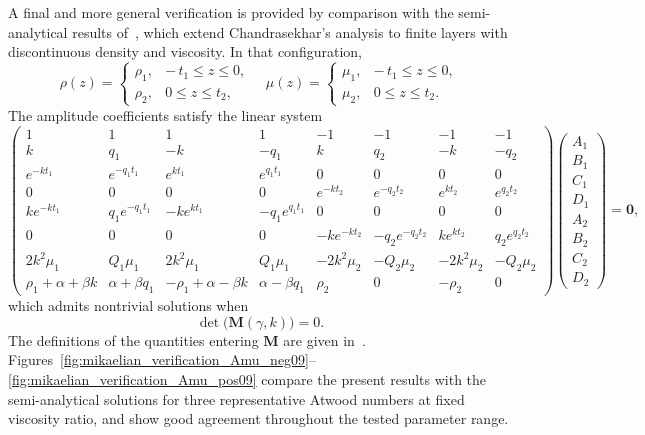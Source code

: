 \documentclass[11pt]{article}
\newenvironment{appen}{\appendix}{}
\begin{document}
\begin{appen}
A final and more general verification is provided by comparison with the semi-analytical results of~\citet{mikaelian-1996}, which extend Chandrasekhar's analysis to finite layers with discontinuous density and viscosity. In that configuration,
\begin{equation}
    \rho(z) =
    \begin{cases}
        \rho_{1}, & -\,t_{1} \le z \le 0, \\
        \rho_{2}, & 0 \le z \le t_{2},
    \end{cases}
    \quad
    \mu(z) =
    \begin{cases}
        \mu_{1}, & -\,t_{1} \le z \le 0, \\
        \mu_{2}, & 0 \le z \le t_{2}.
    \end{cases}
\end{equation}
The amplitude coefficients satisfy the linear system
\begin{equation}
    \begin{pmatrix}
        1 & 1 & 1 & 1 & -1 & -1 & -1 & -1 \\
        k & q_{1} & -k & -q_{1} & k & q_{2} & -k & -q_{2} \\
        e^{-k t_{1}} & e^{-q_{1} t_{1}} & e^{k t_{1}} & e^{q_{1} t_{1}} & 0 & 0 & 0 & 0 \\
        0 & 0 & 0 & 0 & e^{-k t_{2}} & e^{-q_{2} t_{2}} & e^{k t_{2}} & e^{q_{2} t_{2}} \\
        k e^{-k t_{1}} & q_{1} e^{-q_{1} t_{1}} & -k e^{k t_{1}} & -q_{1} e^{q_{1} t_{1}} & 0 & 0 & 0 & 0 \\
        0 & 0 & 0 & 0 & -k e^{-k t_{2}} & -q_{2} e^{-q_{2} t_{2}} & k e^{k t_{2}} & q_{2} e^{q_{2} t_{2}} \\
        2k^{2}\mu_{1} & Q_{1}\mu_{1} & 2k^{2}\mu_{1} & Q_{1}\mu_{1} & -2k^{2}\mu_{2} & -Q_{2}\mu_{2} & -2k^{2}\mu_{2} & -Q_{2}\mu_{2} \\
        \rho_{1}+\alpha+\beta k & \alpha+\beta q_{1} & -\rho_{1}+\alpha-\beta k & \alpha-\beta q_{1} & \rho_{2} & 0 & -\rho_{2} & 0
    \end{pmatrix}
    \begin{pmatrix}
        A_{1}\\ B_{1}\\ C_{1}\\ D_{1}\\ A_{2}\\ B_{2}\\ C_{2}\\ D_{2}
    \end{pmatrix}
    = \boldsymbol{0},
\end{equation}
which admits nontrivial solutions when
\begin{equation}
    \label{eq:mikaelian_determinant}
    \det\bigl(\boldsymbol{M}(\gamma, k)\bigr) = 0.
\end{equation}
The definitions of the quantities entering \(\boldsymbol{M}\) are given in~\citet{mikaelian-1996}.
Figures~\ref{fig:mikaelian_verification_Amu_neg09}--\ref{fig:mikaelian_verification_Amu_pos09} compare the present results with the semi-analytical solutions for three representative Atwood numbers at fixed viscosity ratio, and show good agreement throughout the tested parameter range.


\end{appen}
\end{document}
